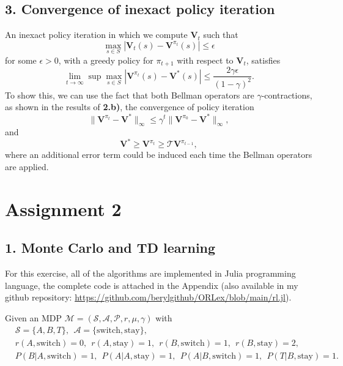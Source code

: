 \documentclass[12pt]{article}
\begin{document}
\subsection*{3. Convergence of inexact policy iteration}
An inexact policy iteration in which we compute $\mathbf{V}_t$ such that
\begin{equation*}
    \max_{s \in S}\left|\mathbf{V}_t(s) - \mathbf{V}^{\pi_t}(s)\right| \leq \epsilon
\end{equation*}
for some $\epsilon > 0$, with a greedy policy for $\pi_{t+1}$ with respect to $\mathbf{V}_t$, satisfies
\begin{equation}
    \lim_{t \rightarrow \infty} \sup \max_{s \in S}\left| \mathbf{V}^{\pi_t}(s) - \mathbf{V}^*(s)\right| \leq \frac{2\gamma\epsilon}{(1-\gamma)^2}.
\end{equation}
To show this, we can use the fact that both Bellman operators are $\gamma$-contractions, as shown in the results of \textbf{2.b)}, the convergence of policy iteration
\begin{equation*}
    \|\mathbf{V}^{\pi_t} - \mathbf{V}^*\|_\infty \leq \gamma^t\|\mathbf{V}^{\pi_0} - \mathbf{V}^*\|_\infty,
\end{equation*}
and
\begin{equation*}
    \mathbf{V}^* \geq \mathbf{V}^{\pi_t} \geq \mathcal{T}\mathbf{V}^{\pi_{t-1}},
\end{equation*}
where an additional error term could be induced each time the Bellman operators are applied.

\section*{Assignment 2}
\subsection*{1. Monte Carlo and TD learning}
For this exercise, all of the algorithms are implemented in Julia programming language, the complete code is attached in the Appendix (also available in my github repository: \url{https://github.com/berylgithub/ORLex/blob/main/rl.jl}).

Given an MDP $\mathcal{M} = (\mathcal{S}, \mathcal{A}, \mathcal{P}, r,\mu, \gamma)$ with
\begin{equation*}
    \begin{split}
        &\mathcal{S} = \{A,B,T\}, ~~ \mathcal{A} = \{\text{switch},\text{stay}\}, \\
        &r(A, \text{switch})=0, ~~ r(A, \text{stay})=1, ~~ r(B, \text{switch})=1, ~~ r(B, \text{stay})=2, \\
        &P(B|A, \text{switch})=1, ~~ P(A|A, \text{stay})=1, ~~P(A|B, \text{switch})=1, ~~P(T|B, \text{stay})=1.
    \end{split}
\end{equation*}
\end{document}
